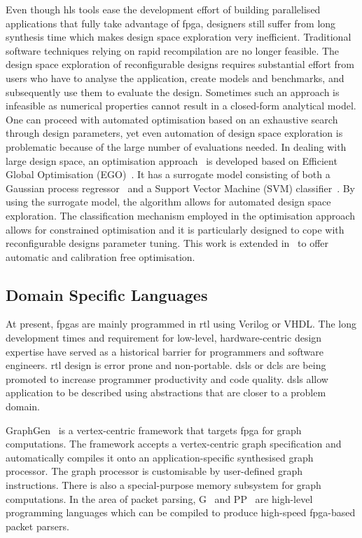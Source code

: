 Even though \gls{hls} tools ease the development effort of building parallelised applications that fully take advantage of \gls{fpga},
designers still suffer from long synthesis time which makes design space exploration very inefficient.
Traditional software techniques relying on rapid recompilation are no longer feasible.
The design space exploration of reconfigurable designs requires substantial effort from users who have to analyse the application, create models and benchmarks, and subsequently use them to evaluate the design.
Sometimes such an approach is infeasible as numerical properties cannot result in a closed-form analytical model.
One can proceed with automated optimisation based on an exhaustive search through design parameters, yet even automation of design space exploration is problematic because of the large number of evaluations needed.
In dealing with large design space, an optimisation approach~\cite{kurek13arc} is developed based on Efficient Global Optimisation (EGO)~\cite{jones98}.
It has a surrogate model consisting of both a Gaussian process regressor~\cite{rasmussen06} and a Support Vector Machine (SVM) classifier~\cite{basudhar12}.
By using the surrogate model, the algorithm allows for automated design space exploration.
The classification mechanism employed in the optimisation approach allows for constrained optimisation and it is particularly designed to cope with reconfigurable designs parameter tuning. 
This work is extended in~\cite{kurek14fccm} to offer automatic and calibration free optimisation.

\subsection{Domain Specific Languages}
At present, \glspl{fpga} are mainly programmed in \gls{rtl} using Verilog or VHDL. 
The long development times and requirement for low-level, hardware-centric design expertise have served as a historical barrier for programmers and software engineers. 
\gls{rtl} design is error prone and non-portable.
\glspl{dsl} or \glspl{dcl} are being promoted to increase programmer productivity and code quality.
\glspl{dsl} allow application to be described using abstractions that are closer to a problem domain. 

GraphGen~\cite{nurvitadhi14} is a vertex-centric framework that targets \gls{fpga} for graph computations.
The framework accepts a vertex-centric graph specification and automatically compiles it onto an application-specific synthesised graph processor.
The graph processor is customisable by user-defined graph instructions.
There is also a special-purpose memory subsystem for graph computations.
In the area of packet parsing, G~\cite{brebner09} and PP~\cite{attig11} are high-level programming languages which can be compiled to produce high-speed \gls{fpga}-based packet parsers.

